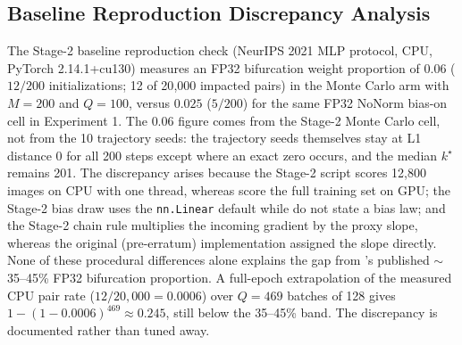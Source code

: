 \documentclass[11pt]{article}
\begin{document}
\subsection{Baseline Reproduction Discrepancy Analysis}\label{sec:exp5}
The Stage-2 baseline reproduction check (NeurIPS 2021 MLP protocol, CPU, PyTorch 2.14.1+cu130) measures an FP32 bifurcation weight proportion of $0.06$ ($12/200$ initializations; 12 of 20{,}000 impacted pairs) in the Monte Carlo arm with $M=200$ and $Q=100$, versus $0.025$ ($5/200$) for the same FP32 NoNorm bias-on cell in Experiment 1. The $0.06$ figure comes from the Stage-2 Monte Carlo cell, not from the 10 trajectory seeds: the trajectory seeds themselves stay at L1 distance 0 for all 200 steps except where an exact zero occurs, and the median $k^\star$ remains 201. The discrepancy arises because the Stage-2 script scores 12{,}800 images on CPU with one thread, whereas \citet{bertoin2021relu} score the full training set on GPU; the Stage-2 bias draw uses the \texttt{nn.Linear} default while \citet{bertoin2021relu} do not state a bias law; and the Stage-2 chain rule multiplies the incoming gradient by the proxy slope, whereas the original (pre-erratum) implementation assigned the slope directly. None of these procedural differences alone explains the gap from \citet{bertoin2021relu}'s published $\sim$35--45\% FP32 bifurcation proportion. A full-epoch extrapolation of the measured CPU pair rate ($12/20{,}000=0.0006$) over $Q=469$ batches of 128 gives $1-(1-0.0006)^{469}\approx0.245$, still below the 35--45\% band. The discrepancy is documented rather than tuned away.
\end{document}
